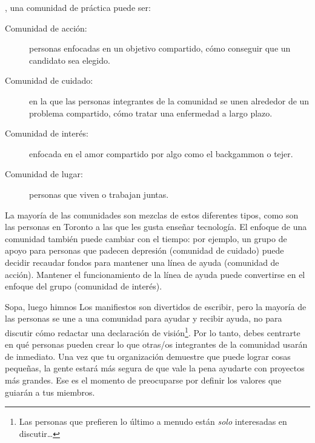 ,
una comunidad de práctica puede ser:

\begin{description}

\item[Comunidad de acción:]
  personas enfocadas en un objetivo compartido,
  cómo conseguir que un candidato sea elegido.

\item[Comunidad de cuidado:]
 en la que las personas integrantes de la comunidad se unen alrededor de un problema compartido, cómo tratar una enfermedad a largo plazo.

\item[Comunidad de interés:]
  enfocada en el amor compartido por algo como el backgammon o tejer.

\item[Comunidad de lugar:]
  personas que viven o trabajan juntas.

\end{description}
 
La mayoría de las comunidades son mezclas de estos diferentes tipos,
como son las personas en Toronto a las que les gusta enseñar tecnología.
El enfoque de una comunidad también puede cambiar con el tiempo:
por ejemplo,
un grupo de apoyo para personas que padecen depresión (comunidad de cuidado)
puede decidir recaudar fondos para mantener una línea de ayuda (comunidad de acción).
Mantener el funcionamiento de la línea de ayuda puede convertirse en el enfoque del grupo (comunidad de interés).

\begin{aside}{Sopa, luego himnos}
  Los manifiestos son divertidos de escribir,
  pero la mayoría de las personas se une a una comunidad para ayudar y recibir ayuda, no para discutir cómo redactar una declaración de visión\footnote{Las personas que prefieren lo último a menudo están \emph{solo} interesadas en discutir{\ldots}}.
  Por lo tanto, debes centrarte en
  qué personas pueden crear lo que otras/os integrantes de la comunidad usarán de inmediato.
  Una vez que tu organización demuestre que puede lograr cosas pequeñas,
  la gente estará más segura de que vale la pena ayudarte con proyectos más grandes.
  Ese es el momento de preocuparse por definir los valores que guiarán a tus miembros.
\end{aside}


